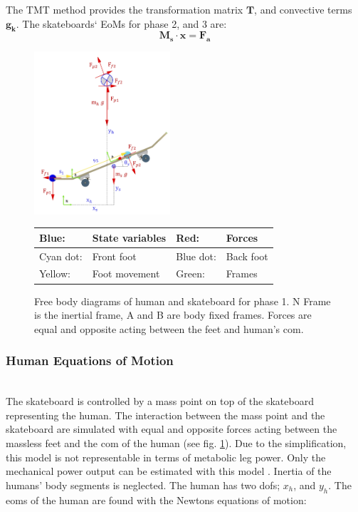 \documentclass[default,iicol]{sn-jnl}
\begin{document}
The TMT method provides the transformation matrix $\mathbf{T}$, and convective terms $\mathbf{g_k}$.
The skateboards` EoMs for phase 2, and 3 are:
\begin{equation}\label{e_eomb}
\mathbf{M_s} \cdot \mathbf{x} =  \mathbf{F_a}
\end{equation}

\begin{figure}
    \centering
    \includegraphics[width=0.45\textwidth]{figure/FBD_skater_feet.png}
    \footnotesize\begin{tabular}{|l l|l l|} \hline
    \color{blue}Blue: & State variables &\color{red} Red: & Forces \\ \hline
    \color{cyan}Cyan dot: & Front foot & \color{blue}Blue dot: & Back foot \\ \hline
    \color{yellow}Yellow: & Foot movement & \color{green}Green: & Frames \\ \hline
    \end{tabular}
    \caption[Free Body Diagrams phase 2 and 3]{Free body diagrams of human and skateboard for phase 1. N Frame is the inertial frame, A and B are body fixed frames. Forces are equal and opposite acting between the feet and human's \gls{com}.}
    \label{f_FBD}
\end{figure}

\subsubsection{Human Equations of Motion} \\
\noindent The skateboard is controlled by a mass point on top of the skateboard representing the human. The interaction between the mass point and the skateboard are simulated with equal and opposite forces acting between the massless feet and the \gls{com} of the human (see fig. \ref{f_FBD}). Due to the simplification, this model is not representable in terms of metabolic leg power. Only the mechanical power output can be estimated with this model \cite{van_der_kruk_power_2018,morin_biomechanics_2018}. Inertia of the humans' body segments is neglected. 
The human has two \glspl{dof}; $x_h$, and $y_h$. The \glspl{eom} of the human are found with the Newtons equations of motion:
\end{document}
